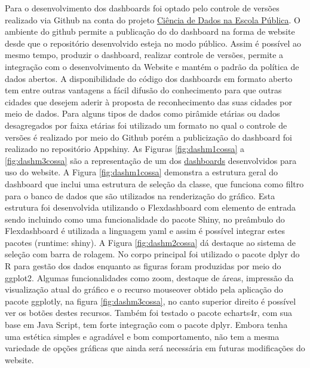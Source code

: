 \documentclass[
]{book}
\begin{document}
Para o desenvolvimento dos dashboards foi optado pelo controle de versões realizado via Github na conta do projeto \href{https://github.com/orgs/cienciadedadosnaep/}{Ciência de Dados na Escola Pública}. O ambiente do github permite a publicação do do dashboard na forma de website desde que o repositório desenvolvido esteja no modo público. Assim é possível ao mesmo tempo, produzir o dashboard, realizar controle de versões, permite a integração com o desenvolvimento da Website e mantém o padrão da política de dados abertos. A disponibilidade do código dos dashboards em formato aberto tem entre outras vantagens a fácil difusão do conhecimento para que outras cidades que desejem aderir à proposta de reconhecimento das suas cidades por meio de dados. Para alguns tipos de dados como pirâmide etárias ou dados desagregados por faixa etárias foi utilizado um formato no qual o controle de versões é realizado por meio do Github porém a publicização do dashboard foi realizado no repositório Appshiny. As Figuras \ref{fig:dashm1cossa} a \ref{fig:dashm3cossa} são a representação de um dos \href{https://robsonpessoa.shinyapps.io/piramide_etaria/}{dashboards} desenvolvidos para uso do website. A Figura \ref{fig:dashm1cossa} demonstra a estrutura geral do dashboard que inclui uma estrutura de seleção da classe, que funciona como filtro para o banco de dados que são utilizados na renderização do gráfico. Esta estrutura foi desenvolvida utilizando o Flexdashboard com elemento de entrada sendo incluindo como uma funcionalidade do pacote Shiny, no preâmbulo do Flexdashboard é utilizada a linguagem yaml e assim é possível integrar estes pacotes (runtime: shiny). A Figura \ref{fig:dashm2cossa} dá destaque ao sistema de seleção com barra de rolagem. No corpo principal foi utilizado o pacote dplyr do R para gestão dos dados enquanto as figuras foram produzidas por meio do ggplot2. Algumas funcionalidades como zoom, destaque de áreas, impressão da visualização atual do gráfico e o recurso mouseover obtido pela aplicação do pacote ggplotly, na figura \ref{fig:dashm3cossa}, no canto superior direito é possível ver os botões destes recursos. Também foi testado o pacote echarts4r, com sua base em Java Script, tem forte integração com o pacote dplyr. Embora tenha uma estética simples e agradável e bom comportamento, não tem a mesma variedade de opções gráficas que ainda será necessária em futuras modificações do website.
\end{document}
